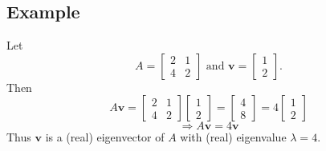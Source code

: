 \documentclass[11pt]{article}
\renewcommand{\vec}[1]{\mathbf{#1}}
\begin{document}
\subsection{Example}
Let
\[ 
A = \begin{bmatrix}
2 & 1 \\
4 & 2
\end{bmatrix}
\text{ and }
\vec{v} = \begin{bmatrix}
1 \\
2
\end{bmatrix}.
\]
Then
\[ A \vec{v} = 
\begin{bmatrix}
2 & 1 \\
4 & 2
\end{bmatrix}
\begin{bmatrix}
1 \\
2
\end{bmatrix}
=
\begin{bmatrix}
4 \\
8
\end{bmatrix}
=
4 \begin{bmatrix}
1 \\
2
\end{bmatrix}
\]
\[ \Rightarrow A \vec{v} = 4 \vec{v} \]
Thus $\vec{v}$ is a (real) eigenvector of $A$ with (real) eigenvalue $\lambda = 4$.
\end{document}
